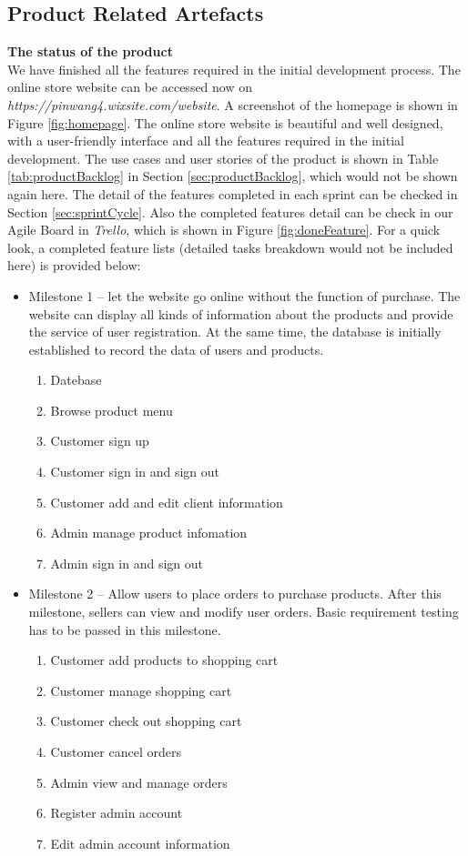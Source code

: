 \documentclass{report}
\begin{document}
\clearpage
\subsection{Product Related Artefacts}
\textbf{The status of the product}
\\
We have finished all the features required in the initial development process. The online store website can be accessed now on \textit{https://pinwang4.wixsite.com/website}. A screenshot of the homepage is shown in Figure \ref{fig:homepage}. The online store website is beautiful and well designed, with a user-friendly interface and all the features required in the initial development. The use cases and user stories of the product is shown in Table \ref{tab:productBacklog} in Section \ref{sec:productBacklog}, which would not be shown again here. The detail of the features completed in each sprint can be checked in Section \ref{sec:sprintCycle}. Also the completed features detail can be check in our Agile Board in \textit{Trello}, which is shown in Figure \ref{fig:doneFeature}. For a quick look, a completed feature lists (detailed tasks breakdown would not be included here) is provided below:
\\
\begin{itemize}
  \item Milestone 1 -- let the website go online without the function of purchase. The website can display all kinds of information about the products and provide the service of user registration. At the same time, the database is initially established to record the data of users and products.
  \begin{enumerate}
    \item Datebase
    \item Browse product menu
    \item Customer sign up
    \item Customer sign in and sign out
    \item Customer add and edit client information
    \item Admin manage product infomation
    \item Admin sign in and sign out
  \end{enumerate}
  \item Milestone 2 -- Allow users to place orders to purchase products. After this milestone, sellers can view and modify user orders. Basic requirement testing has to be passed in this milestone.
  \begin{enumerate}
    \item Customer add products to shopping cart
    \item Customer manage shopping cart
    \item Customer check out shopping cart
    \item Customer cancel orders
    \item Admin view and manage orders
    \item Register admin account
    \item Edit admin account information
  \end{enumerate}
\end{itemize}
\end{document}
